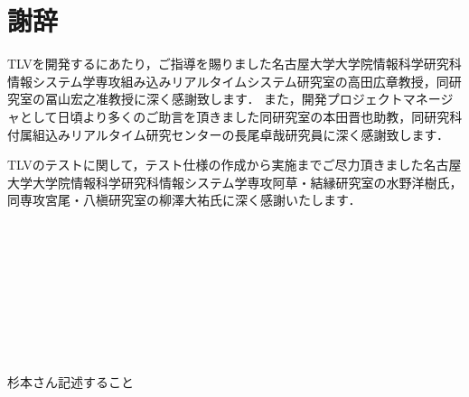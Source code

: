 \chapter*{謝辞}

TLVを開発するにあたり，ご指導を賜りました名古屋大学大学院情報科学研究科情報システム学専攻組み込みリアルタイムシステム研究室の高田広章教授，同研究室の冨山宏之准教授に深く感謝致します．
また，開発プロジェクトマネージャとして日頃より多くのご助言を頂きました同研究室の本田晋也助教，同研究科付属組込みリアルタイム研究センターの長尾卓哉研究員に深く感謝致します．

TLVのテストに関して，テスト仕様の作成から実施までご尽力頂きました名古屋大学大学院情報科学研究科情報システム学専攻阿草・結縁研究室の水野洋樹氏，同専攻宮尾・八槇研究室の柳澤大祐氏に深く感謝いたします．

　

　

　

　

　

杉本さん記述すること